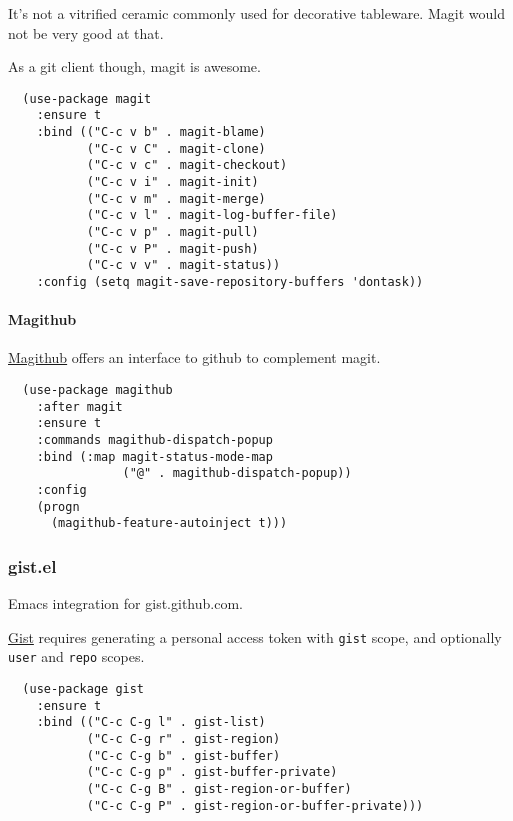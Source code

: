 \documentclass[11pt]{article}
\begin{document}
It's not a vitrified ceramic commonly used for decorative tableware.
Magit would not be very good at that.

As a git client though, magit is awesome.

\begin{verbatim}
  (use-package magit
    :ensure t
    :bind (("C-c v b" . magit-blame)
           ("C-c v C" . magit-clone)
           ("C-c v c" . magit-checkout)
           ("C-c v i" . magit-init)
           ("C-c v m" . magit-merge)
           ("C-c v l" . magit-log-buffer-file)
           ("C-c v p" . magit-pull)
           ("C-c v P" . magit-push)
           ("C-c v v" . magit-status))
    :config (setq magit-save-repository-buffers 'dontask))
\end{verbatim}

\paragraph*{Magithub}
\label{sec:orgdcc6e12}

\href{https://github.com/vermiculus/github}{Magithub} offers an interface to github to complement magit.

\begin{verbatim}
  (use-package magithub
    :after magit
    :ensure t
    :commands magithub-dispatch-popup
    :bind (:map magit-status-mode-map
                ("@" . magithub-dispatch-popup))
    :config
    (progn
      (magithub-feature-autoinject t)))
\end{verbatim}

\subsubsection*{gist.el}
\label{sec:org458843c}

Emacs integration for gist.github.com.

\href{https://github.com/defunkt/gist.el}{Gist} requires generating a personal access token with \texttt{gist} scope, and
optionally \texttt{user} and \texttt{repo} scopes.

\begin{verbatim}
  (use-package gist
    :ensure t
    :bind (("C-c C-g l" . gist-list)
           ("C-c C-g r" . gist-region)
           ("C-c C-g b" . gist-buffer)
           ("C-c C-g p" . gist-buffer-private)
           ("C-c C-g B" . gist-region-or-buffer)
           ("C-c C-g P" . gist-region-or-buffer-private)))
\end{verbatim}
\end{document}
